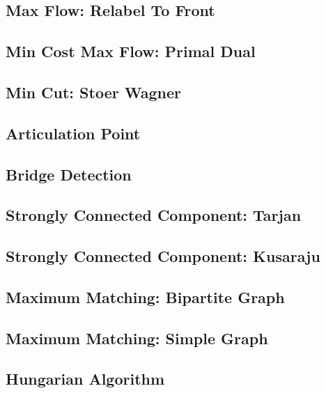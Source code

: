 \documentclass{article}
\begin{document}
    \subsection{Max Flow: Relabel To Front}
        
    \subsection{Min Cost Max Flow: Primal Dual}
        
    \subsection{Min Cut: Stoer Wagner}
        
    \subsection{Articulation Point}
        
    \subsection{Bridge Detection}
        
    \subsection{Strongly Connected Component: Tarjan}
        
    \subsection{Strongly Connected Component: Kusaraju}
        
    \subsection{Maximum Matching: Bipartite Graph}
        
    \subsection{Maximum Matching: Simple Graph}
    \subsection{Hungarian Algorithm}
        
\end{document}
